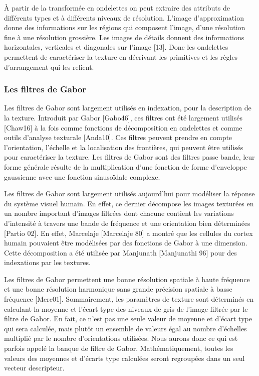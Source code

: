 À partir de la transformée en ondelettes on peut extraire des attributs de différents types et à différents niveaux de résolution. L'image d'approximation donne des informations sur les régions qui composent l'image, d'une résolution fine à une résolution grossière. Les images de
détails donnent des informations horizontales, verticales et diagonales sur l'image [13]. Donc les ondelettes permettent de caractériser la texture en décrivant les primitives et les règles d'arrangement qui les relient.


\subsubsection{Les filtres de Gabor}

Les filtres de Gabor sont largement utilisés en indexation, pour la description de la texture.
Introduit par Gabor [Gabo46], ces filtres ont été largement utilisés [Chaw16] à la fois comme fonctions de décomposition en ondelettes et comme outils d'analyse texturale [Anda10]. Ces filtres peuvent prendre en compte l'orientation, l'échelle et la localisation des frontières, qui peuvent être
utilisés pour caractériser la texture. Les filtres de Gabor sont des filtres passe bande, leur forme générale résulte de la multiplication d’une fonction de forme d'enveloppe gaussienne avec une fonction sinusoïdale complexe.

Les filtres de Gabor sont largement utilisés aujourd’hui pour modéliser la réponse du système visuel humain. En effet, ce dernier décompose les images texturées en un nombre important d'images filtrées dont chacune contient les variations d'intensité à travers une bande de fréquence et une orientation bien déterminées [Partio 02]. En effet, Marcelaje [Marcelaje 80] a montré que les cellules du cortex humain pouvaient être modélisées par des fonctions de Gabor à une dimension. Cette décomposition a été utilisée par Manjunath [Manjunathi 96] pour des indexations par les textures.

Les filtres de Gabor permettent une bonne résolution spatiale à haute fréquence et une bonne résolution harmonique sans grande précision spatiale à basse fréquence [Merc01]. Sommairement, les paramètres de texture sont déterminés en calculant la moyenne et l’écart type des niveaux de gris de l’image filtrée par le filtre de Gabor. En fait, ce n’est pas une seule valeur de moyenne et d’écart type qui sera calculée, mais plutôt un ensemble de valeurs égal au nombre d’échelles multiplié par le nombre
d’orientations utilisées. Nous aurons donc ce qui est parfois appelé la banque de filtre de Gabor. Mathématiquement, toutes les valeurs des moyennes et d’écarts type calculées seront regroupées dans un seul vecteur descripteur. \\

